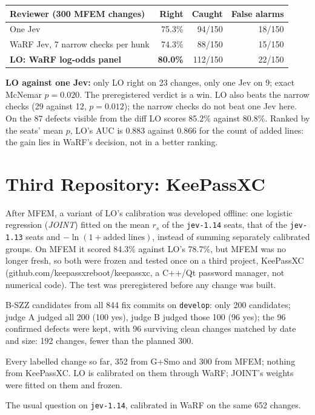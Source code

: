\documentclass[11pt,a4paper]{article}
\begin{document}
\begin{center}
\begin{tabular}{lrrr}
\toprule
Reviewer (300 MFEM changes) & Right & Caught & False alarms \\
\midrule
One Jev                                   & 75.3\% & 94/150 & 18/150 \\
WaRF Jev, 7 narrow checks per hunk        & 74.3\% & 88/150 & 15/150 \\
\textbf{LO: WaRF log-odds panel}          & \textbf{80.0\%} & 112/150 & 22/150 \\
\bottomrule
\end{tabular}
\end{center}

\textbf{LO against one Jev:} only LO right on 23 changes, only one Jev on 9;
exact McNemar $p = 0.020$. The preregistered verdict is a win. LO also beats
the narrow checks (29 against 12, $p = 0.012$); the narrow checks do not beat
one Jev here. On the 87 defects visible from the diff LO scores 85.2\% against
80.8\%. Ranked by the seats' mean $p$, LO's AUC is 0.883 against 0.866 for the
count of added lines: the gain lies in WaRF's decision, not in a better ranking.

\section{Third Repository: KeePassXC}

After MFEM, a variant of LO's calibration was developed offline: one logistic
regression (\emph{JOINT}) fitted on the mean $r_s$ of the \texttt{jev-1.14}
seats, that of the \texttt{jev-1.13} seats and $-\ln(1 + \text{added lines})$,
instead of summing separately calibrated groups. On MFEM it scored 84.3\%
against LO's 78.7\%, but MFEM was no longer fresh, so both were frozen and
tested once on a third project, KeePassXC (github.com/keepassxreboot/keepassxc,
a C++/Qt password manager, not numerical code). The test was preregistered
before any change was built.

\begin{description}[leftmargin=1.5em]
\item[Set] B-SZZ candidates from all 844 fix commits on \texttt{develop}: only
  200 candidates; judge A judged all 200 (100 yes), judge B judged those 100
  (96 yes); the 96 confirmed defects were kept, with 96 surviving clean changes
  matched by date and size: 192 changes, fewer than the planned 300.
\item[Training] Every labelled change so far, 352 from G+Smo and 300 from MFEM;
  nothing from KeePassXC. LO is calibrated on them through WaRF; JOINT's
  weights were fitted on them and frozen.
\item[One Jev] The usual question on \texttt{jev-1.14}, calibrated in WaRF on
  the same 652 changes.
\end{description}
\end{document}
